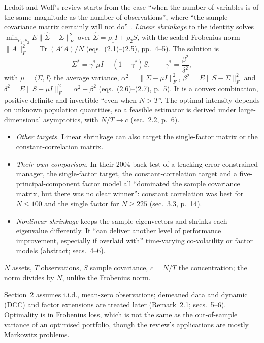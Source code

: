 \begin{qfmethod}\label{meth:portfolio-covariance-estimation}
 Ledoit and Wolf's review starts from the case ``when the number of variables is of the same magnitude as the number of observations'', where ``the sample covariance matrix certainly will not do'' \citep[UZH ECON WP~323, version of February 2020, abstract, p.~1]{wide-ledoit-wolf-review}. \emph{Linear shrinkage} to the identity solves $\min_{\rho_1,\rho_2}E\|\hat\Sigma-\Sigma\|_F^2$ over $\hat\Sigma=\rho_1I+\rho_2S$, with the scaled Frobenius norm $\|A\|_F^2=\operatorname{Tr}(A'A)/N$ (eqs.~(2.1)--(2.5), pp.~4--5). The solution is
\[ \Sigma^*=\gamma^*\mu I+(1-\gamma^*)S,\qquad \gamma^*=\frac{\beta^2}{\delta^2}, \]
with $\mu=\langle\Sigma,I\rangle$ the average variance, $\alpha^2=\|\Sigma-\mu I\|_F^2$, $\beta^2=E\|S-\Sigma\|_F^2$ and $\delta^2=E\|S-\mu I\|_F^2=\alpha^2+\beta^2$ (eqs.~(2.6)--(2.7), p.~5). It is a convex combination, positive definite and invertible ``even when $N>T$''. The optimal intensity depends on unknown population quantities, so a feasible estimator is derived under large-dimensional asymptotics, with $N/T\to c$ (sec.~2.2, p.~6).
\begin{itemize}
\item \emph{Other targets.} Linear shrinkage can also target the single-factor matrix or the constant-correlation matrix.
\item \emph{Their own comparison.} In their 2004 back-test of a tracking-error-constrained manager, the single-factor target, the constant-correlation target and a five-principal-component factor model all ``dominated the sample covariance matrix, but there was no clear winner'': constant correlation was best for $N\le100$ and the single factor for $N\ge225$ (sec.~3.3, p.~14).
\item \emph{Nonlinear shrinkage} keeps the sample eigenvectors and shrinks each eigenvalue differently. It ``can deliver another level of performance improvement, especially if overlaid with'' time-varying co-volatility or factor models (abstract; secs.~4--6).
\end{itemize}

 $N$ assets, $T$ observations, $S$ sample covariance, $c=N/T$ the concentration; the norm divides by $N$, unlike the Frobenius norm.

 Section~2 assumes i.i.d., mean-zero observations; demeaned data and dynamic (DCC) and factor extensions are treated later (Remark~2.1; secs.~5--6). Optimality is in Frobenius loss, which is not the same as the out-of-sample variance of an optimised portfolio, though the review's applications are mostly Markowitz problems.


\end{qfmethod}
